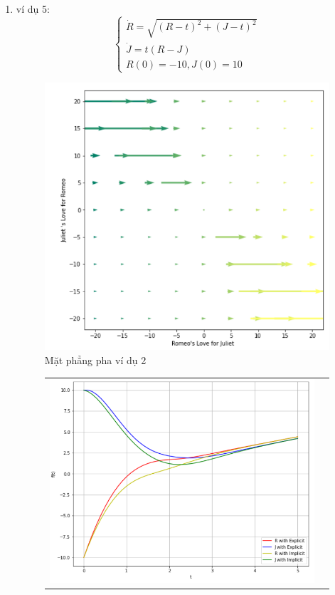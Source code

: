 \documentclass[a4paper]{article}
\begin{document}
\begin{enumerate}
\begin{enumerate}
 \item ví dụ 5:
    \begin{equation} \label{ex:vd5}
        \begin{cases}
    \dot{R} = \sqrt{(R-t)^2+(J-t)^2}\\
    \dot{J} = t(R-J)\\
    R(0)=-10,J(0) = 10
        \end{cases}
    \end{equation}
    \begin{figure}[htp]
    \centering
    \includegraphics[scale = .8]{Images/Bt4/vd5/field.png}
    \caption{Mặt phẳng pha ví dụ 2}
\end{figure} 
\newpage
\begin{figure}[htp] 
    \begin{tabular}{cc}
        \includegraphics[scale=.58]{Images/Bt4/vd5/h=0,1.png} &

\end{tabular}
\end{figure}
\end{enumerate}
\end{enumerate}
\end{document}
